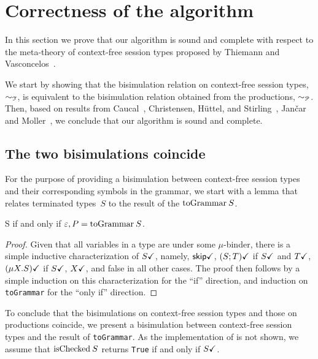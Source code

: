 \section{Correctness of the algorithm}
\label{sec:soundness}

In this section we prove that our algorithm is sound and complete
with respect to the meta-theory of context-free session types proposed
by Thiemann and Vasconcelos~\cite{thiemann2016context}.

We start by showing that the bisimulation relation on context-free
session types, $\sim_\mathcal T$, is equivalent to the bisimulation
relation obtained from the productions, $\sim_\mathcal P$.  Then, based on
results from Caucal~\cite{caucal1986decidabilite}, Christensen,
H{\"{u}}ttel, and Stirling~\cite{DBLP:journals/iandc/ChristensenHS95},
Jan{\v{c}}ar and Moller~\cite{janvcar1999techniques}, we conclude that
our algorithm is sound and complete.

\subsection{The two bisimulations coincide}

For the purpose of providing a bisimulation between context-free
session types and their corresponding symbols in the grammar, we start
with a lemma that relates terminated types~$S$ to the result of the
$\toGrammarf S$.

\begin{lemma}
  \label{lem:terminated-togrammar}
  \DONE S if and only if $\varepsilon, P = \toGrammarf S$.
\end{lemma}

\begin{proof} Given that all variables in a type are under some
  $\mu$-binder, there is a simple inductive characterization of
  $S\checkmark$, namely, $\mathsf{skip}\checkmark$, $(S;T)\checkmark$ if $S\checkmark$ and
  $T\checkmark$, $(\mu X.S)\checkmark$ if $S\checkmark$, $X\checkmark$, and false in
  all other cases. The proof then follows by a simple induction on
  this characterization for the ``if'' direction, and induction on
  \lstinline|toGrammar| for the ``only if'' direction.
\end{proof}

To conclude that the bisimulations on context-free session types and
those on productions coincide, we present a bisimulation between
context-free session types and the result of \lstinline|toGrammar|.
%
As the implementation of \isCheckedf is not shown, we assume that
$\isCheckedf S$ returns \lstinline|True| if and only if $S\checkmark$.

